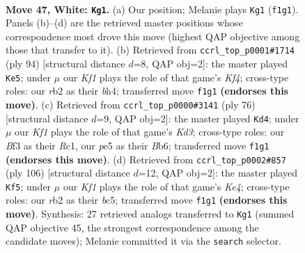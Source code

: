 \documentclass[11pt]{article}
\begin{document}
\clearpage

\begin{figure}[p]\centering
\begin{subfigure}{0.46\textwidth}\centering
\resizebox{\linewidth}{!}{%
\newchessgame
\chessboard[
  setfen={6k1/8/8/4p1p1/5p2/5B2/1r6/5K2 w - - 5 47},
  showmover=false,
  pgfstyle=straightmove, color=movearrow, markmove={f1-g1}
]}
\caption{}
\end{subfigure}\hfill
\begin{subfigure}{0.46\textwidth}\centering
\resizebox{\linewidth}{!}{%
\newchessgame
\chessboard[
  setfen={6k1/8/8/1p6/2p2K1b/2B5/8/8 w - - 0 48},
  showmover=false,
  pgfstyle=straightmove, color=movearrow, markmove={f4-e5}
]}
\caption{}
\end{subfigure}
\\[4pt]
\begin{subfigure}{0.46\textwidth}\centering
\resizebox{\linewidth}{!}{%
\newchessgame
\chessboard[
  setfen={8/8/1Bp1k3/1p6/8/3K4/7r/2R5 w - - 4 39},
  showmover=false,
  pgfstyle=straightmove, color=movearrow, markmove={d3-d4}
]}
\caption{}
\end{subfigure}\hfill
\begin{subfigure}{0.46\textwidth}\centering
\resizebox{\linewidth}{!}{%
\newchessgame
\chessboard[
  setfen={6k1/2B5/8/2bP2p1/4K2p/8/8/8 w - - 0 54},
  showmover=false,
  pgfstyle=straightmove, color=movearrow, markmove={e4-f5}
]}
\caption{}
\end{subfigure}
\caption{\textbf{Move 47, White: \texttt{Kg1}.} (a) Our position; Melanie plays \texttt{Kg1} (\texttt{f1g1}). Panels (b)--(d) are the retrieved master positions whose correspondence most drove this move (highest QAP objective among those that transfer to it). (b) Retrieved from \texttt{ccrl\_top\_p0001\#1714} (ply 94) [structural distance $d$=8, QAP obj=2]: the master played \texttt{Ke5}; under $\mu$ our \emph{Kf1} plays the role of that game's \emph{Kf4}; cross-type roles: our \emph{r}b2 as their \emph{b}h4; transferred move \texttt{f1g1} \textbf{(endorses this move)}. (c) Retrieved from \texttt{ccrl\_top\_p0000\#3141} (ply 76) [structural distance $d$=9, QAP obj=2]: the master played \texttt{Kd4}; under $\mu$ our \emph{Kf1} plays the role of that game's \emph{Kd3}; cross-type roles: our \emph{B}f3 as their \emph{R}c1, our \emph{p}e5 as their \emph{B}b6; transferred move \texttt{f1g1} \textbf{(endorses this move)}. (d) Retrieved from \texttt{ccrl\_top\_p0002\#857} (ply 106) [structural distance $d$=12, QAP obj=2]: the master played \texttt{Kf5}; under $\mu$ our \emph{Kf1} plays the role of that game's \emph{Ke4}; cross-type roles: our \emph{r}b2 as their \emph{b}c5; transferred move \texttt{f1g1} \textbf{(endorses this move)}. Synthesis: 27 retrieved analogs transferred to \texttt{Kg1} (summed QAP objective 45, the strongest correspondence among the candidate moves); Melanie committed it via the \texttt{search} selector.}
\label{fig:thought-m92}
\end{figure}
\end{document}
